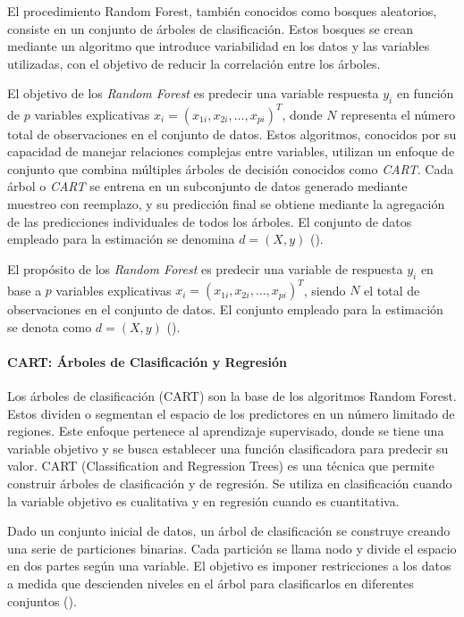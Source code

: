 El procedimiento Random Forest, también conocidos como bosques aleatorios, consiste en un conjunto de árboles de clasificación. Estos bosques se crean mediante un algoritmo que introduce variabilidad en los datos y las variables utilizadas, con el objetivo de reducir la correlación entre los árboles.


El objetivo de los \textit{Random Forest} es predecir una variable respuesta \(y_i\) en función de \(p\) variables explicativas \(x_i = (x_{1i}, x_{2i}, \ldots, x_{pi})^T\), donde \(N\) representa el número total de observaciones en el conjunto de datos. Estos algoritmos, conocidos por su capacidad de manejar relaciones complejas entre variables, utilizan un enfoque de conjunto que combina múltiples árboles de decisión conocidos como \textit{CART}. Cada árbol o \textit{CART} se entrena en un subconjunto de datos generado mediante muestreo con reemplazo, y su predicción final se obtiene mediante la agregación de las predicciones individuales de todos los árboles. El conjunto de datos empleado para la estimación se denomina \(d = (X, y)\) (\cite{ho1995random}).


El propósito de los \textit{Random Forest} es predecir una variable de respuesta \(y_i\) en base a \(p\) variables explicativas \(x_i = (x_{1i}, x_{2i}, \ldots, x_{pi})^T\), siendo \(N\) el total de observaciones en el conjunto de datos. El conjunto empleado para la estimación se denota como \(d = (X, y)\) (\cite{ho1995random}).



\paragraph{CART: Árboles de Clasificación y Regresión}
Los árboles de clasificación (CART) son la base de los algoritmos Random Forest. Estos dividen o segmentan el espacio de los predictores en un número limitado de regiones. Este enfoque pertenece al aprendizaje supervisado, donde se tiene una variable objetivo y se busca establecer una función clasificadora para predecir su valor. CART (Classification and Regression Trees) es una técnica que permite construir árboles de clasificación y de regresión. Se utiliza en clasificación cuando la variable objetivo es cualitativa y en regresión cuando es cuantitativa.

Dado un conjunto inicial de datos, un árbol de clasificación se construye creando una serie de particiones binarias. Cada partición se llama nodo y divide el espacio en dos partes según una variable. El objetivo es imponer restricciones a los datos a medida que descienden niveles en el árbol para clasificarlos en diferentes conjuntos (\cite{wu2008top}).

